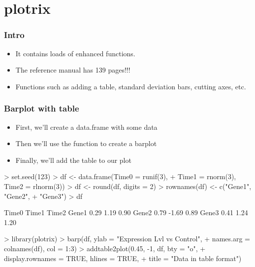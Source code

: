 \section{plotrix}

\begin{frame}[allowframebreaks]
  \frametitle{Intro}
  \begin{itemize}
  \item It contains loads of enhanced  functions.
  \item The reference manual has \alert{139} pages!!!
  \item Functions such as adding a table, standard deviation bars, cutting axes, etc.
  \end{itemize}
\end{frame}

\begin{frame}
  \frametitle{Barplot with table}
  \begin{itemize}
  \item First, we'll create a data.frame with some data
  \item Then we'll use the  function to create a barplot
  \item Finally, we'll add the table to our plot
  \end{itemize}
\begin{Schunk}
\begin{Sinput}
> set.seed(123)
> df <- data.frame(Time0 = runif(3), 
+     Time1 = rnorm(3), Time2 = rlnorm(3))
> df <- round(df, digits = 2)
> rownames(df) <- c("Gene1", "Gene2", 
+     "Gene3")
> df
\end{Sinput}
\begin{Soutput}
      Time0 Time1 Time2
Gene1  0.29  1.19  0.90
Gene2  0.79 -1.69  0.89
Gene3  0.41  1.24  1.20
\end{Soutput}
\begin{Sinput}
> library(plotrix)
> barp(df, ylab = "Expression Lvl vs Control", 
+     names.arg = colnames(df), col = 1:3)
> addtable2plot(0.45, -1, df, bty = "o", 
+     display.rownames = TRUE, hlines = TRUE, 
+     title = "Data in table format")
\end{Sinput}
\end{Schunk}

\end{frame}
